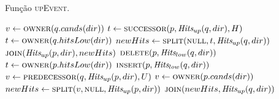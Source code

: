 \begin{algorithm}
    \caption{Função \textsc{upEvent}.}
    \label{parcinetico:eventoup}
    \begin{algorithmic}[1]
                \State $v \leftarrow \Call{owner}{q.cands(dir)}$
                    \State {}
                \EndIf
                \State {}
                \State $t \leftarrow \Call{successor}{p, \Hits_{up}(q, dir), H}$
                    \State $t \leftarrow \Call{owner}{q.hitsLow(dir)}$
                \EndIf
                \State $newHits \leftarrow \Call{split}{\nnull, t, \Hits_{up}(q, dir)}$
                \State $\Call{join}{\Hits_{up}(p, dir), newHits}$
                \State $\Call{delete}{p, \Hits_{low}(q, dir)}$
                    \State {}
                \EndIf
            \Else
                    \State $t \leftarrow \Call{owner}{p.hitsLow(dir)}$
                        \State {}
                    \EndIf
                    \State $\Call{insert}{p, \Hits_{low}(q, dir)}$
                    \State $v \leftarrow \Call{predecessor}{q, \Hits_{up}(p, dir), U}$
                        \State $v \leftarrow \Call{owner}{p.cands(dir)}$
                    \EndIf
                    \State $newHits \leftarrow \Call{split}{v, \nnull, \Hits_{up}(p,dir)}$
                    \State $\Call{join}{newHits, \Hits_{up}(q, dir)}$
                    \State {}
                        \State {}
                    \EndIf
                \EndIf
            \EndIf
        \EndFunction
    \end{algorithmic}
\end{algorithm}